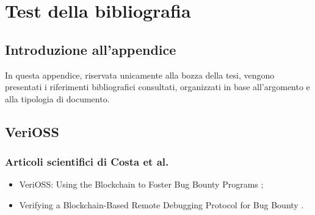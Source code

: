 
\chapter*{Test della bibliografia}
\label{appendix:bib-test}

\acresetall


\section*{Introduzione all'appendice}


In questa appendice, riservata unicamente alla bozza della tesi, vengono presentati i riferimenti bibliografici consultati, organizzati in base all'argomento e alla tipologia di documento.

\section*{VeriOSS}

\subsection*{Articoli scientifici di Costa et al.}
\begin{itemize}

\item VeriOSS: Using the Blockchain to Foster Bug Bounty Programs \cite{canidio2021verioss};

\item Verifying a Blockchain-Based Remote Debugging Protocol for Bug Bounty \cite{degano2021verioss}.

\end{itemize}

